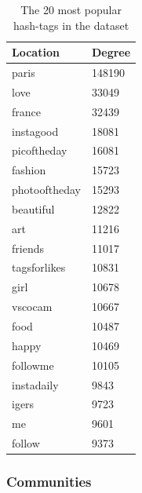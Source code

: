 \begin{table}
  \centering
  \begin{tabu}{| l | l |}
    \hline
    \textbf{Location} & \textbf{Degree} \\ \hline
    paris & 148190 \\ \hline
    love & 33049 \\ \hline
    france & 32439 \\ \hline
    instagood & 18081 \\ \hline
    picoftheday & 16081 \\ \hline
    fashion & 15723 \\ \hline
    photooftheday & 15293 \\ \hline
    beautiful & 12822 \\ \hline
    art & 11216 \\ \hline
    friends & 11017 \\ \hline
    tagsforlikes & 10831 \\ \hline
    girl & 10678 \\ \hline
    vscocam & 10667 \\ \hline
    food & 10487 \\ \hline
    happy & 10469 \\ \hline
    followme & 10105 \\ \hline
    instadaily & 9843 \\ \hline
    igers & 9723 \\ \hline
    me & 9601 \\ \hline
    follow & 9373 \\ \hline
    \hline  
  \end{tabu}
  \caption{The 20 most popular hash-tags in the dataset}
  \label{tbl:hashtags}
\end{table}

\subsubsection{Communities}

